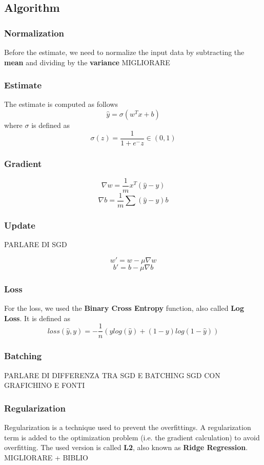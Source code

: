 \documentclass[
	letterpaper, %
	10pt, %
]{class}
\begin{document}
\subsection{Algorithm}

\subsubsection{Normalization}
Before the estimate, we need to normalize the input data by subtracting the \textbf{mean} and dividing by the \textbf{variance}
MIGLIORARE

\subsubsection{Estimate}
The estimate is computed as follows
$$ \hat{y} = \sigma(w^Tx + b) $$
where $\sigma$ is defined as
$$ \sigma(z) = \frac{1}{1 + e^-z} \in (0,1) $$

\subsubsection{Gradient}

$$ \nabla w = \frac{1}{m}x^T(\hat{y} - y) $$
$$\nabla b = \frac{1}{m}\sum(\hat{y} - y) b $$

\subsubsection{Update}

PARLARE DI SGD

$$ w' = w - \mu \nabla w $$
$$ b' = b - \mu \nabla b $$

\subsubsection{Loss}
For the loss, we used the \textbf{Binary Cross Entropy} function, also called \textbf{Log Loss}.
It is defined as
$$ loss(\hat{y}, y) = -\frac{1}{n}(y log(\hat{y}) + (1-y)log(1-\hat{y})) $$

\subsubsection{Batching}
PARLARE DI DIFFERENZA TRA SGD E BATCHING SGD CON GRAFICHINO E FONTI

\subsubsection{Regularization}
Regularization is a technique used to prevent the overfittings. A regularization term is added to the optimization problem (i.e. the gradient calculation) to avoid overfitting.
The used version is called \textbf{L2}, also known as \textbf{Ridge Regression}. MIGLIORARE + BIBLIO\\
\end{document}
